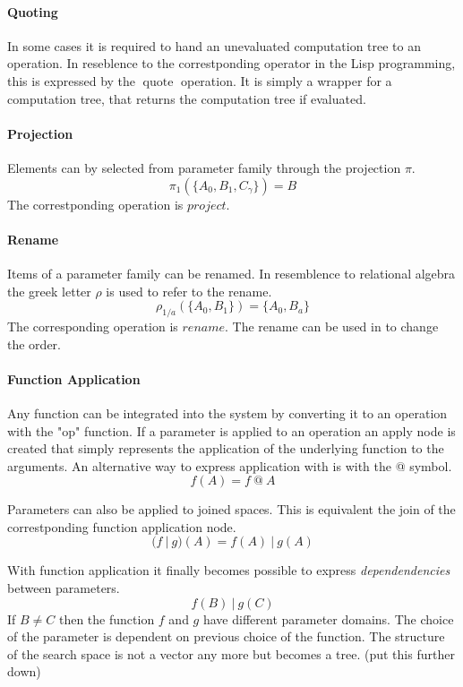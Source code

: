 \documentclass[english]{article}
\begin{document}
\paragraph{Quoting}
In some cases it is required to hand an unevaluated computation tree to an operation. In reseblence to the correstponding operator in the Lisp programming, this is expressed by the $\operatorname{quote}$ operation. It is simply a wrapper for a computation tree, that returns the computation tree if evaluated.

\paragraph{Projection}
Elements can by selected from parameter family through the projection $\pi$.
$$\pi_1(\{A_0, B_1, C_\gamma\}) = B$$
The correstponding operation is $project$.

\paragraph{Rename}
Items of a parameter family can be renamed. In resemblence to relational algebra the greek letter $\rho$ is used to refer to the rename.
$$\rho_{1/a}(\{A_{0}, B_{1}\}) = \{A_{0}, B_{a}\}$$
The corresponding operation is $rename$. The rename can be used in to change the order.

\paragraph{Function Application}
Any function can be integrated into the system by converting it to an operation with the "op" function. If a parameter is applied to an operation an apply node is created that simply represents the application of the underlying function to the arguments. An alternative way to express application with is with the @ symbol.
$$f(A) = f\ @\ A$$

Parameters can also be applied to joined spaces. This is equivalent the join of the correstponding function application node.
$$(f\ |\ g)(A) = f(A)\ |\ g(A)$$

With function application it finally becomes possible to express \textit{dependendencies} between parameters.
$$f(B)\ |\ g(C)$$
If $B \neq C$ then the function $f$ and $g$ have different parameter domains. The choice of the parameter is dependent on previous choice of the function.  The structure of the search space is not a vector any more but becomes a tree. (put this further down)
\end{document}
